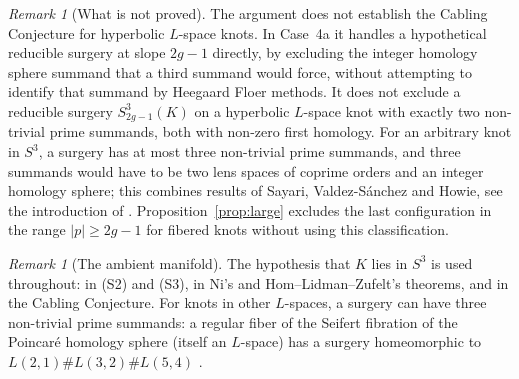 \documentclass[12pt]{article}
\newcommand{\Surg}[2]{S^3_{#1}(#2)}
\theoremstyle{definition}
\theoremstyle{remark}
\newtheorem{remark}[theorem]{Remark}
\begin{document}
\begin{remark}[What is not proved]\label{rem:notproved}
The argument does not establish the Cabling Conjecture for hyperbolic
\(L\)-space knots. In Case~4a it handles a hypothetical reducible surgery
at slope \(2g-1\) directly, by excluding the integer homology sphere
summand that a third summand would force, without attempting to identify
that summand by Heegaard Floer methods. It does not exclude a reducible
surgery \(\Surg{2g-1}{K}\) on a hyperbolic \(L\)-space knot with exactly
two non-trivial prime summands, both with non-zero first homology.
For an arbitrary knot in \(S^3\), a surgery has at most three
non-trivial prime summands, and three summands would have to be two lens
spaces of coprime orders and an integer homology sphere; this combines
results of Sayari, Valdez-S\'anchez and Howie, see the introduction of
\cite{Howie2010}. Proposition~\ref{prop:large} excludes the last
configuration in the range \(|p|\geq2g-1\) for fibered knots without
using this classification.
\end{remark}

\begin{remark}[The ambient manifold]
The hypothesis that \(K\) lies in \(S^3\) is used throughout: in (S2) and
(S3), in Ni's and Hom--Lidman--Zufelt's theorems, and in the Cabling
Conjecture. For knots in other \(L\)-spaces, a surgery can have three
non-trivial prime summands: a regular fiber of the Seifert fibration of
the Poincar\'e homology sphere (itself an \(L\)-space) has a surgery
homeomorphic to \(L(2,1)\#L(3,2)\#L(5,4)\) \cite{Caudell2021}.
\end{remark}
\end{document}
